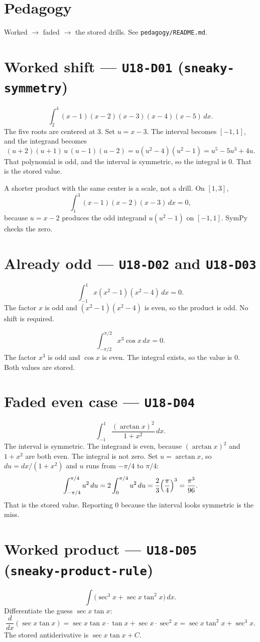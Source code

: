 \section{Pedagogy}
Worked $\to$ faded $\to$ the stored drills. See \texttt{pedagogy/README.md}.

\section{Worked shift --- \texttt{U18-D01} (\texttt{sneaky-symmetry})}
\[
\int_{2}^{4}(x-1)(x-2)(x-3)(x-4)(x-5)\,dx.
\]
The five roots are centered at $3$. Set $u=x-3$. The interval becomes $[-1,1]$, and the integrand becomes
\[
(u+2)(u+1)\,u\,(u-1)(u-2)=u(u^{2}-4)(u^{2}-1)=u^{5}-5u^{3}+4u.
\]
That polynomial is odd, and the interval is symmetric, so the integral is $0$. That is the stored value.

A shorter product with the same center is a scale, not a drill. On $[1,3]$,
\[
\int_{1}^{3}(x-1)(x-2)(x-3)\,dx=0,
\]
because $u=x-2$ produces the odd integrand $u(u^{2}-1)$ on $[-1,1]$. SymPy checks the zero.

\section{Already odd --- \texttt{U18-D02} and \texttt{U18-D03}}
\[
\int_{-1}^{1}x(x^{2}-1)(x^{2}-4)\,dx=0.
\]
The factor $x$ is odd and $(x^{2}-1)(x^{2}-4)$ is even, so the product is odd. No shift is required.

\[
\int_{-\pi/2}^{\pi/2}x^{3}\cos x\,dx=0.
\]
The factor $x^{3}$ is odd and $\cos x$ is even. The integral exists, so the value is $0$. Both values are stored.

\section{Faded even case --- \texttt{U18-D04}}
\[
\int_{-1}^{1}\frac{(\arctan x)^{2}}{1+x^{2}}\,dx.
\]
The interval is symmetric. The integrand is even, because $(\arctan x)^{2}$ and $1+x^{2}$ are both even. The integral is not zero. Set $u=\arctan x$, so $du=dx/(1+x^{2})$ and $u$ runs from $-\pi/4$ to $\pi/4$:
\[
\int_{-\pi/4}^{\pi/4}u^{2}\,du=2\int_{0}^{\pi/4}u^{2}\,du=\frac{2}{3}\Bigl(\frac\pi4\Bigr)^{3}=\frac{\pi^{3}}{96}.
\]
That is the stored value. Reporting $0$ because the interval looks symmetric is the miss.

\section{Worked product --- \texttt{U18-D05} (\texttt{sneaky-product-rule})}
\[
\int\bigl(\sec^{3}x+\sec x\tan^{2}x\bigr)\,dx.
\]
Differentiate the guess $\sec x\tan x$:
\[
\frac{d}{dx}(\sec x\tan x)=\sec x\tan x\cdot\tan x+\sec x\cdot\sec^{2}x=\sec x\tan^{2}x+\sec^{3}x.
\]
The stored antiderivative is $\sec x\tan x+C$.

